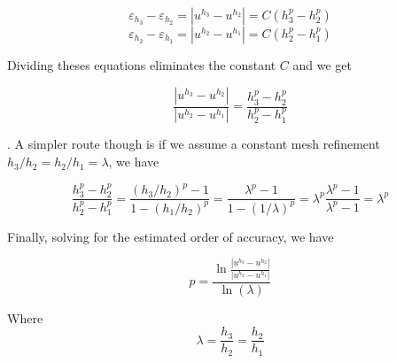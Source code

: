 \documentclass[11pt]{article}
\begin{document}
\begin{equation}
	\varepsilon_{h_3}
	-
	\varepsilon_{h_2}
	=
	|u^{h_3} - u^{h_2}|
	=
	C (h_3^p - h_2^p)
\end{equation}
\begin{equation}
	\varepsilon_{h_2}
	-
	\varepsilon_{h_1}
	=
	|u^{h_2} - u^{h_1}|
	=
	C (h_2^p - h_1^p)
\end{equation}

Dividing theses equations eliminates the constant $C$ and we get

\begin{equation}
	\boxed{
	\frac{|u^{h_3} - u^{h_2}|}
	     {|u^{h_2} - u^{h_1}|}
	=
	\frac{h_3^p - h_2^p}{h_2^p - h_1^p}
	}
\end{equation}

. A simpler route though is if we assume a constant mesh refinement $h_3/h_2 = h_2/h_1 = \lambda$, we have

\begin{equation}
	\frac{h_3^p - h_2^p}{h_2^p - h_1^p}
	=
	\frac{(h_3/h_2)^p - 1}{1 - (h_1/h_2)^p}
	=
	\frac{\lambda^p - 1}{1 - (1/\lambda)^p}
	=
	\lambda^p
	\frac{\lambda^p - 1}{\lambda^p - 1}
	=
	\lambda^p
\end{equation}

Finally, solving for the estimated order of accuracy, we have

\begin{equation}
	\boxed{
	p =
	\frac{\ln{\frac{|u^{h_3} - u^{h_2}|}
	     {|u^{h_2} - u^{h_1}|}}}{\ln(\lambda)}
	     }
\end{equation}

Where
\begin{equation}
	\boxed{
	\lambda
	=
	\frac{h_3}{h_2}
	=
	\frac{h_2}{h_1}
	}
\end{equation}
\end{document}
